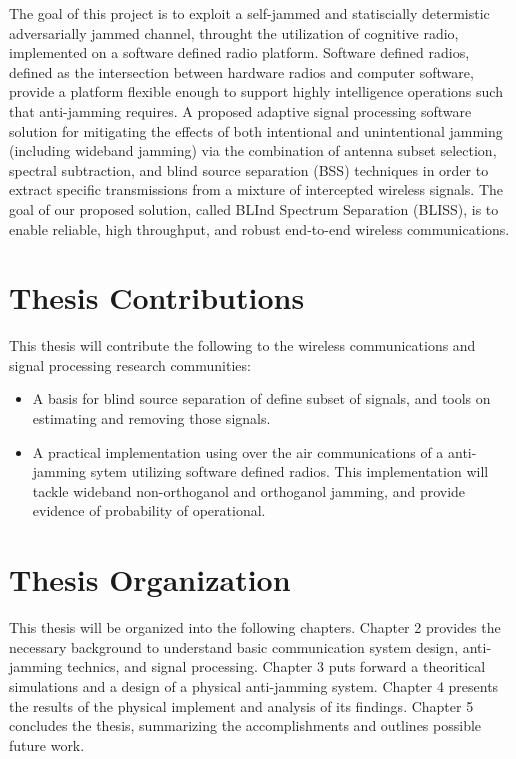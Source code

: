 \documentclass[11pt]{mvlthesis}
\begin{document}
The goal of this project is to exploit a self-jammed and statiscially determistic adversarially jammed channel, throught the utilization of cognitive radio, implemented on a software defined radio platform.  Software defined radios, defined as the intersection between hardware radios and computer software\cite{4}, provide a platform flexible enough to support highly intelligence operations such that anti-jamming requires.  A proposed adaptive signal processing software solution for mitigating the effects of both intentional and unintentional jamming (including wideband jamming) via the combination of antenna subset selection, spectral subtraction, and blind source separation (BSS) techniques in order to extract specific transmissions from a mixture of intercepted wireless signals. The goal of our proposed solution, called BLInd Spectrum Separation (BLISS), is to enable reliable, high throughput, and robust end-to-end wireless communications.\\

\section{Thesis Contributions}

This thesis will contribute the following to the wireless communications and signal processing research communities:

\begin{itemize}
\item A basis for blind source separation of define subset of signals, and tools on estimating and removing those signals.

\item A practical implementation using over the air communications of a anti-jamming sytem utilizing software defined radios. This implementation will tackle wideband non-orthoganol and orthoganol jamming, and provide evidence of probability of operational.
\end{itemize}


\section{Thesis Organization}

This thesis will be organized into the following chapters.  Chapter 2 provides the necessary background to understand basic communication system design, anti-jamming technics, and signal processing.  Chapter 3 puts forward a theoritical simulations and a design of a physical anti-jamming system.  Chapter 4 presents the results of the physical implement and analysis of its findings.  Chapter 5 concludes the thesis, summarizing the accomplishments and outlines possible future work.
\end{document}
